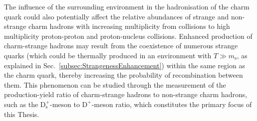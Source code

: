 The influence of the surrounding environment in the hadronisation of the charm quark could also potentially affect the relative abundances of strange and non-strange charm hadrons with increasing multiplicity from  \ee collisions to high multiplicity proton-proton and proton-nucleus collisions. Enhanced production of charm-strange hadrons may result from the coexistence of numerous strange quarks (which could be thermally produced in an environment with $T \gg m_\mathrm{s}$, as explained in Sec.~\ref{subsec:StrangenessEnhancement}) within the same region as the charm quark, thereby increasing the probability of recombination between them. This phenomenon can be studied through the measurement of the production-yield ratio of charm-strange hadrons to non-strange charm hadrons, such as the $\mathrm{D_s^+}$-meson to $\mathrm{D^+}$-meson ratio, which constitutes the primary focus of this Thesis.